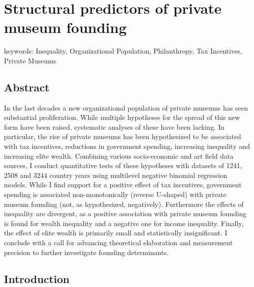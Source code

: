 \documentclass[11pt]{article}
\author{Johannes }
\date{\today}
\title{}
\begin{document}
\section*{Structural predictors of private museum founding}

\noindent
keywords: Inequality, Organizational Population, Philanthropy, Tax Incentives, Private Museums  

\subsection*{Abstract}

In the last decades a new organizational population of private museums has seen substantial proliferation.
While multiple hypotheses for the spread of this new form have been raised, systematic analyses of these have been lacking.
In particular, the rise of private museums has been hypothesized to be associated with tax incentives, reductions in government spending, increasing inequality and increasing elite wealth. 
Combining various socio-economic and art field data sources, I conduct quantitative tests of these hypotheses with datasets of 1241, 2508 and 3244 country years using multilevel negative binomial regression models.
While I find support for a positive effect of tax incentives, government spending is associated non-monotonically (reverse U-shaped) with private museum founding (not, as hypothesized, negatively). 
Furthermore the effects of inequality are divergent, as a positive association with private museum founding is found for wealth inequality and a negative one for income inequality.
Finally, the effect of elite wealth is primarily small and statistically insignificant. 
I conclude with a call for advancing theoretical elaboration and measurement precision to further investigate founding determinants. 





\subsection*{Introduction}
\end{document}
